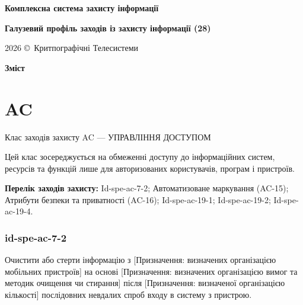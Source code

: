 \documentclass{article}
\newcommand\HUGE[1]{\fontsize{40}{40}\selectfont #1}
\begin{document}
\pagestyle{fancy}

\begin{titlepage}
  \AddToShipoutPictureBG*{\AtPageLowerLeft{\color{nato}\rule{\paperwidth}{\paperheight}}}
  \color{white}\thispagestyle{empty}\vspace*{4cm}\centering
  {\Huge  \textbf{Комплексна система захисту інформації} \par} \vspace{2cm}
  {\HUGE  \textbf{Галузевий профіль заходів із захисту інформації (28)} \par} \vspace{2.5cm}
  \vfill
  {\large 2026 \copyright\ Критпографічні Телесистеми \par}
\end{titlepage}

\newpage

\begin{center}
  {\Huge\color{nato}\bfseries Зміст\par}
\end{center}
\vspace{40pt}
\tableofcontents

\begin{abstract}
Галузевий профіль — розробляється галузевим органом, погоджується з Держспецзв’язку та затверджується наказом/рішенням відповідного органу. Включає лише додаткові вимоги (відмінності) відносно Базового профілю.
\end{abstract}

\section{AC}
Клас заходів захисту AC --- УПРАВЛІННЯ ДОСТУПОМ

Цей клас зосереджується на обмеженні доступу до інформаційних систем, ресурсів та функцій лише для авторизованих користувачів, програм і пристроїв.

\textbf{Перелік заходів захисту:} Id-spe-ac-7-2; Автоматизоване маркування (AC-15); Атрибути безпеки та приватності (AC-16); Id-spe-ac-19-1; Id-spe-ac-19-2; Id-spe-ac-19-4.

\subsubsection{id-spe-ac-7-2}
Очистити або стерти інформацію з [Призначення: визначених організацією мобільних пристроїв] на основі [Призначення: визначених організацією вимог та методик очищення чи стирання] після [Призначення: визначеної організацією кількості] послідовних невдалих спроб входу в систему з пристрою.
\end{document}
